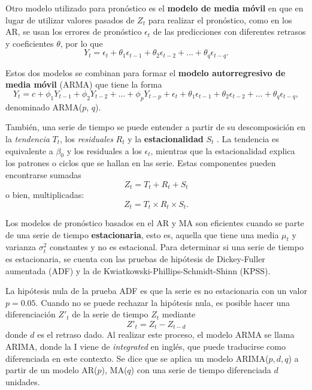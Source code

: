 \documentclass{elsarticle}
\begin{document}
Otro modelo utilizado para pronóstico es el \textbf{modelo de media móvil} en que en lugar de utilizar valores pasados de $Z_t$ para realizar el pronóstico, como en los AR, se usan los errores de pronóstico $\epsilon_t$ de las predicciones con diferentes retrasos y coeficientes $\theta$, por lo que
\begin{equation}
    Y_{t} = \epsilon_t + \theta_{1} \epsilon_{t-1} + \theta_{2}\epsilon_{t-2} + \ldots + \theta_{q}\epsilon_{t-q}.
\end{equation}

Estos dos modelos se combinan para formar el \textbf{modelo autorregresivo de media móvil} (ARMA) que tiene la forma
\begin{equation}
    Y_t = c + \phi_1 Y_{t-1} + \phi_2 Y_{t-2} + \ldots + \phi_p Y_{t-p} + \epsilon_t + \theta_{1} \epsilon_{t-1} + \theta_{2}\epsilon_{t-2} + \ldots + \theta_{q}\epsilon_{t-q},
\end{equation}
denominado ARMA($p$, $q$).

También, una serie de tiempo se puede entender a partir de su descomposición en la \textit{tendencia} $T_t$, los \textit{residuales} $R_t$ y la \textbf{estacionalidad} $S_t$ \cite{Brockwell2002}. La tendencia es equivalente a $\beta_0$ y los residuales a los $\epsilon_t$, mientras que la estacionalidad explica los patrones o ciclos que se hallan en las serie. Estas componentes pueden encontrarse sumadas
\begin{equation}
    Z_t = T_t + R_t + S_t
\end{equation}
o bien, multiplicadas:
\begin{equation}
    Z_t = T_t \times R_t \times S_t.
\end{equation}

Los modelos de pronóstico basados en el AR y MA son eficientes cuando se parte de una serie de tiempo \textbf{estacionaria}, esto es, aquella que tiene una media $\mu_t$ y varianza $\sigma^2_t$ constantes y no es estacional. Para determinar si una serie de tiempo es estacionaria, se cuenta con las pruebas de hipótesis de Dickey-Fuller aumentada (ADF) y la de Kwiatkowski-Phillips-Schmidt-Shinn (KPSS). 

La hipótesis nula de la prueba ADF es que la serie es no estacionaria con un valor $p = 0.05$. Cuando no se puede rechazar la hipótesis nula, es posible hacer una diferenciación $Z'_t$ de la serie de tiempo $Z_t$ mediante
\begin{equation}
\label{diferenciacion}
    Z'_t = Z_t - Z_{t - d}
\end{equation}
donde $d$ es el retraso dado. Al realizar este proceso, el modelo ARMA se llama ARIMA, donde la I viene de \textit{integrated} en inglés, que puede traducirse como diferenciada en este contexto. Se dice que se aplica un modelo ARIMA($p, d, q$) a partir de un modelo AR($p$), MA($q$) con una serie de tiempo diferenciada $d$ unidades.
\end{document}
